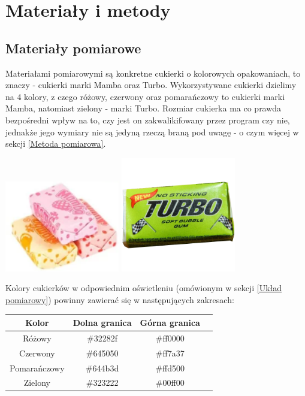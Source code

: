 \documentclass{article}
\begin{document}
\section{Materiały i metody}
\label{Materiały i metody}
\subsection{Materiały pomiarowe}
\label{Materiały pomiarowe}
Materiałami pomiarowymi są konkretne cukierki o kolorowych opakowaniach, to znaczy - cukierki marki Mamba oraz Turbo. Wykorzystywane cukierki dzielimy na 4 kolory, z czego różowy, czerwony oraz pomarańczowy to cukierki marki Mamba, natomiast zielony - marki Turbo. Rozmiar cukierka ma co prawda bezpośredni wpływ na to, czy jest on zakwalikifowany przez program czy nie, jednakże jego wymiary nie są jedyną rzeczą braną pod uwagę - o czym więcej w sekcji \ref{Metoda pomiarowa}.

\begin{center}
\includegraphics[width=5cm]{mamba.png}
\includegraphics[width=5cm]{gumaturbo.png}
\end{center}

Kolory cukierków w odpowiednim oświetleniu (omówionym w sekcji \ref{Układ pomiarowy}) powinny zawierać się w następujących zakresach:

\begin{center}
\begin{tabular}{ |c|c|c|c| }
 \hline
 Kolor & Dolna granica & Górna granica \\
 \hline
 Różowy & \#32282f & \#ff0000 \\
 \hline
 Czerwony & \#645050 & \#ff7a37 \\
 \hline
 Pomarańczowy & \#644b3d & \#ffd500 \\
 \hline
 Zielony & \#323222 & \#00ff00 \\
 \hline
\end{tabular}
\end{center}
\end{document}
